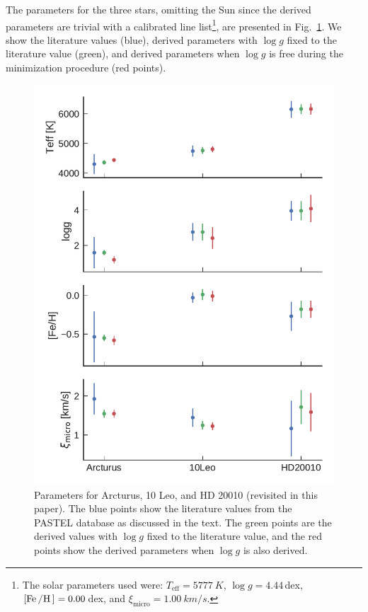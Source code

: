 The parameters for the three stars, omitting the Sun since the derived parameters are trivial with a
calibrated line list\footnote{The solar parameters used were: $T_\mathrm{eff}=\SI{5777}{K}$, $\log
g=4.44\,$dex, $[\ion{Fe}/\ion{H}]=0.00\,$dex, and $\xi_\mathrm{micro}=\SI{1.00}{km/s}$.}, are
presented in Fig.~\ref{fig:parameters}. We show the literature values (blue), derived parameters
with $\log g$ fixed to the literature value (green), and derived parameters when $\log g$ is free
during the minimization procedure (red points).

\begin{figure}[htpb!]
    \centering
    \includegraphics[width=1.0\linewidth]{figures/parameters.pdf}
    \caption{Parameters for Arcturus, 10 Leo, and HD 20010 (revisited in this
             paper). The blue points show the literature values from the PASTEL
             database as discussed in the text. The green points are the
             derived values with $\log g$ fixed to the literature value, and the
             red points show the derived parameters when $\log g$ is also
             derived.}
    \label{fig:parameters}
\end{figure}



